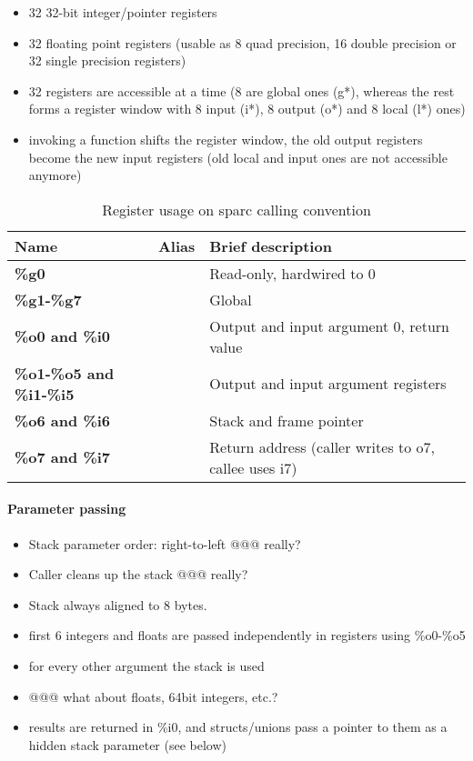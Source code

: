 \begin{itemize}
\item 32 32-bit integer/pointer registers
\item 32 floating point registers (usable as 8 quad precision, 16 double precision or 32 single precision registers)
\item 32 registers are accessible at a time (8 are global ones (g*), whereas the rest forms a register window with 8 input (i*), 8 output (o*) and 8 local (l*) ones)
\item invoking a function shifts the register window, the old output registers become the new input registers (old local and input ones are not accessible anymore)
\end{itemize}

\begin{table}[h]
\begin{tabular}{lll}
\hline
Name                                 & Alias                   & Brief description\\
\hline
{\bf \%g0}                           &                         & Read-only, hardwired to 0 \\
{\bf \%g1-\%g7}                      &                         & Global \\
{\bf \%o0 and \%i0}                  &                         & Output and input argument 0, return value \\
{\bf \%o1-\%o5 and \%i1-\%i5}        &                         & Output and input argument registers \\
{\bf \%o6 and \%i6}                  &                         & Stack and frame pointer \\
{\bf \%o7 and \%i7}                  &                         & Return address (caller writes to o7, callee uses i7) \\
\end{tabular}
\caption{Register usage on sparc calling convention}
\end{table}

\paragraph{Parameter passing}
\begin{itemize}
\item Stack parameter order: right-to-left @@@ really?
\item Caller cleans up the stack @@@ really?
\item Stack always aligned to 8 bytes.
\item first 6 integers and floats are passed independently in registers using \%o0-\%o5
\item for every other argument the stack is used
\item @@@ what about floats, 64bit integers, etc.?
\item results are returned in \%i0, and structs/unions pass a pointer to them as a hidden stack parameter (see below)
\end{itemize}

